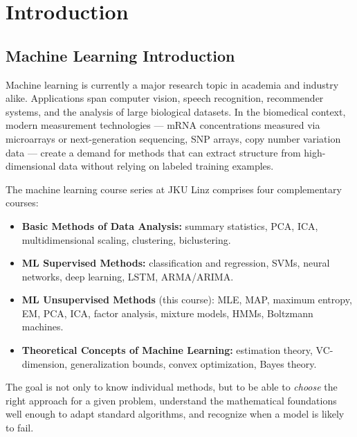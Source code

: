 \documentclass[11pt, oneside]{book}
\begin{document}
\begingroup
  \let\cleardoublepage\relax
  \let\clearpage\relax
  \tableofcontents
\endgroup

\mainmatter


\chapter{Introduction}

\section{Machine Learning Introduction}

Machine learning is currently a major research topic in academia and industry alike.
Applications span computer vision, speech recognition, recommender systems, and the
analysis of large biological datasets.
In the biomedical context, modern measurement technologies --- mRNA concentrations
measured via microarrays or next-generation sequencing, SNP arrays, copy number
variation data --- create a demand for methods that can extract structure from
high-dimensional data without relying on labeled training examples.

The machine learning course series at JKU Linz comprises four complementary courses:
\begin{itemize}
  \item \textbf{Basic Methods of Data Analysis:} summary statistics, PCA, ICA,
        multidimensional scaling, clustering, biclustering.
  \item \textbf{ML Supervised Methods:} classification and regression, SVMs, neural
        networks, deep learning, LSTM, ARMA/ARIMA.
  \item \textbf{ML Unsupervised Methods} (this course): MLE, MAP, maximum entropy,
        EM, PCA, ICA, factor analysis, mixture models, HMMs, Boltzmann machines.
  \item \textbf{Theoretical Concepts of Machine Learning:} estimation theory,
        VC-dimension, generalization bounds, convex optimization, Bayes theory.
\end{itemize}

The goal is not only to know individual methods, but to be able to \emph{choose}
the right approach for a given problem, understand the mathematical foundations well
enough to adapt standard algorithms, and recognize when a model is likely to fail.
\end{document}
